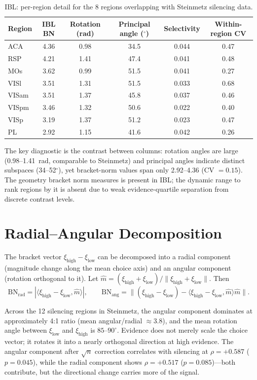 \documentclass[9pt,lineno]{elife}
\begin{document}
\begin{table}[h]
\centering
\caption{IBL: per-region detail for the 8 regions overlapping with Steinmetz silencing data.}
\label{tab:ibl_detail}
\small
\begin{tabular}{lccccc}
\toprule
Region & IBL BN & Rotation (rad) & Principal angle ($^\circ$) & Selectivity & Within-region CV \\
\midrule
ACA & 4.36 & 0.98 & 34.5 & 0.044 & 0.47 \\
RSP & 4.21 & 1.41 & 47.4 & 0.041 & 0.48 \\
MOs & 3.62 & 0.99 & 51.5 & 0.041 & 0.27 \\
VISl & 3.51 & 1.31 & 51.5 & 0.033 & 0.68 \\
VISam & 3.51 & 1.37 & 45.8 & 0.037 & 0.46 \\
VISpm & 3.46 & 1.32 & 50.6 & 0.022 & 0.40 \\
VISp & 3.19 & 1.37 & 51.2 & 0.023 & 0.47 \\
PL & 2.92 & 1.15 & 41.6 & 0.042 & 0.26 \\
\bottomrule
\end{tabular}
\end{table}

The key diagnostic is the contrast between columns: rotation angles are large (0.98--1.41~rad, comparable to Steinmetz) and principal angles indicate distinct subspaces (34--52$^\circ$), yet bracket-norm values span only 2.92--4.36 (CV $= 0.15$). The geometry bracket norm measures is present in IBL; the dynamic range to rank regions by it is absent due to weak evidence-quartile separation from discrete contrast levels.

\section{Radial--Angular Decomposition}
\label{app:decomposition}

The bracket vector $\xi_{\text{high}} - \xi_{\text{low}}$ can be decomposed into a radial component (magnitude change along the mean choice axis) and an angular component (rotation orthogonal to it). Let $\hat{m} = (\xi_{\text{high}} + \xi_{\text{low}}) / \lVert \xi_{\text{high}} + \xi_{\text{low}} \rVert$. Then
\[
\text{BN}_{\text{rad}} = |\langle \xi_{\text{high}} - \xi_{\text{low}}, \hat{m} \rangle|, \qquad
\text{BN}_{\text{ang}} = \lVert (\xi_{\text{high}} - \xi_{\text{low}}) - \langle \xi_{\text{high}} - \xi_{\text{low}}, \hat{m} \rangle \hat{m} \rVert .
\]

Across the 12 silencing regions in Steinmetz, the angular component dominates at approximately 4:1 ratio (mean angular/radial $\approx 3.8$), and the mean rotation angle between $\xi_{\text{low}}$ and $\xi_{\text{high}}$ is $85$--$90^\circ$. Evidence does not merely scale the choice vector; it rotates it into a nearly orthogonal direction at high evidence. The angular component after $\sqrt{n}$ correction correlates with silencing at $\rho = +0.587$ ($p = 0.045$), while the radial component shows $\rho = +0.517$ ($p = 0.085$)---both contribute, but the directional change carries more of the signal.
\end{document}
